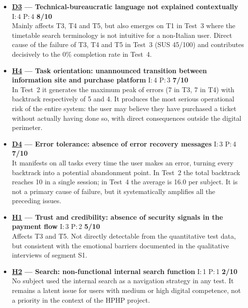 ﻿\documentclass[11pt,a4paper]{article}
\begin{document}
\begin{tcolorbox}[base]
\begin{itemize}[leftmargin=*,itemsep=8pt]
    \item \textbf{\hyperref[iss:D3]{D3} --- Technical-bureaucratic language
    not explained contextually}
    \hfill I:\,4 \textbar{} P:\,4 \textbar{} \textbf{8/10}\\
    Mainly affects T3, T4 and T5, but also emerges on T1 in Test~3
    where the timetable search terminology is not intuitive for a
    non-Italian user. Direct cause of the failure of T3, T4 and T5 in Test~3
    (SUS 45/100) and contributes decisively to the 0\% completion
    rate in Test~4.

    \item \textbf{\hyperref[iss:H4]{H4} --- Task orientation:
    unannounced transition between information site and purchase
    platform}
    \hfill I:\,4 \textbar{} P:\,3 \textbar{} \textbf{7/10}\\
    In Test~2 it generates the maximum peak of errors
    (7 in T3, 7 in T4) with backtrack respectively of 5 and 4.
    It produces the most serious operational risk of the entire system:
    the user may believe they have purchased a ticket without actually having
    done so, with direct consequences outside the digital perimeter.

    \item \textbf{\hyperref[iss:D4]{D4} --- Error tolerance:
    absence of error recovery messages}
    \hfill I:\,3 \textbar{} P:\,4 \textbar{} \textbf{7/10}\\
    It manifests on all tasks every time the user makes an
    error, turning every backtrack into a potential abandonment
    point. In Test~2 the total backtrack reaches 10
    in a single session; in Test~4 the average is 16.0 per subject.
    It is not a primary cause of failure, but it systematically amplifies
    all the preceding issues.

    \item \textbf{\hyperref[iss:H1]{H1} --- Trust and credibility:
    absence of security signals in the payment flow}
    \hfill I:\,3 \textbar{} P:\,2 \textbar{} \textbf{5/10}\\
    Affects T3 and T5. Not directly detectable from the quantitative test
    data, but consistent with the emotional barriers documented in the
    qualitative interviews of segment S1.

    \item \textbf{\hyperref[iss:H2]{H2} --- Search:
    non-functional internal search function}
    \hfill I:\,1 \textbar{} P:\,1 \textbar{} \textbf{2/10}\\
    No subject used the internal search as a navigation
    strategy in any test. It remains a latent issue for users
    with medium or high digital competence, not a priority in the context
    of the HPHP project.

\end{itemize}
\end{tcolorbox}
\end{document}
